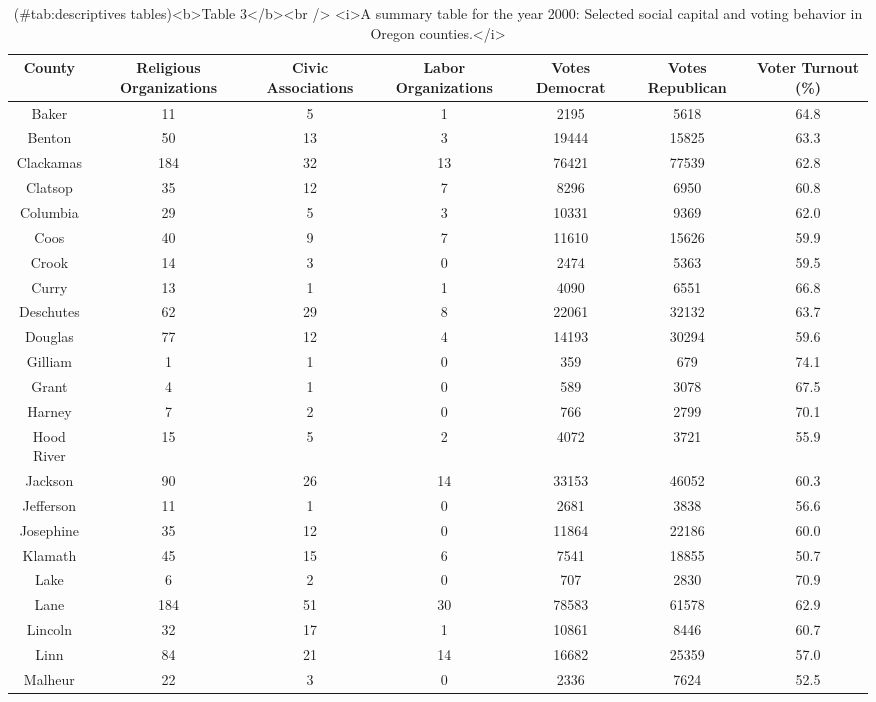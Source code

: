 \documentclass[
  english,
  man]{apa6}
\begin{document}
\begin{table}

\caption{(\#tab:descriptives tables)<b>Table 3</b><br /> <i>A summary table for the year 2000: Selected social capital and voting behavior in Oregon counties.</i>}
\centering
\begin{tabular}[t]{c|c|c|c|c|c|c}
\hline
County & Religious Organizations & Civic Associations & Labor Organizations & Votes Democrat & Votes Republican & Voter Turnout (\%)\\
\hline
Baker & 11 & 5 & 1 & 2195 & 5618 & 64.8\\
\hline
Benton & 50 & 13 & 3 & 19444 & 15825 & 63.3\\
\hline
Clackamas & 184 & 32 & 13 & 76421 & 77539 & 62.8\\
\hline
Clatsop & 35 & 12 & 7 & 8296 & 6950 & 60.8\\
\hline
Columbia & 29 & 5 & 3 & 10331 & 9369 & 62.0\\
\hline
Coos & 40 & 9 & 7 & 11610 & 15626 & 59.9\\
\hline
Crook & 14 & 3 & 0 & 2474 & 5363 & 59.5\\
\hline
Curry & 13 & 1 & 1 & 4090 & 6551 & 66.8\\
\hline
Deschutes & 62 & 29 & 8 & 22061 & 32132 & 63.7\\
\hline
Douglas & 77 & 12 & 4 & 14193 & 30294 & 59.6\\
\hline
Gilliam & 1 & 1 & 0 & 359 & 679 & 74.1\\
\hline
Grant & 4 & 1 & 0 & 589 & 3078 & 67.5\\
\hline
Harney & 7 & 2 & 0 & 766 & 2799 & 70.1\\
\hline
Hood River & 15 & 5 & 2 & 4072 & 3721 & 55.9\\
\hline
Jackson & 90 & 26 & 14 & 33153 & 46052 & 60.3\\
\hline
Jefferson & 11 & 1 & 0 & 2681 & 3838 & 56.6\\
\hline
Josephine & 35 & 12 & 0 & 11864 & 22186 & 60.0\\
\hline
Klamath & 45 & 15 & 6 & 7541 & 18855 & 50.7\\
\hline
Lake & 6 & 2 & 0 & 707 & 2830 & 70.9\\
\hline
Lane & 184 & 51 & 30 & 78583 & 61578 & 62.9\\
\hline
Lincoln & 32 & 17 & 1 & 10861 & 8446 & 60.7\\
\hline
Linn & 84 & 21 & 14 & 16682 & 25359 & 57.0\\
\hline
Malheur & 22 & 3 & 0 & 2336 & 7624 & 52.5\\

\end{tabular}
\end{table}
\end{document}
